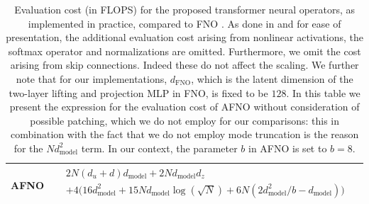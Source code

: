 \documentclass[twoside]{article}
\newcommand{\1}{\mathbbm{1}}
\begin{document}
\begin{table}[htbp]
\begin{tabular}{|l|c|c|}
        \hline
        \textbf{AFNO}& $ \begin{aligned}
            &2N(d_u+d)d_{\textrm{model}} +2Nd_{\textrm{model}}d_z\\
            &+4\bigl(16d_{\textrm{model}}^2 + 15Nd_{\textrm{model}}\log(\sqrt{N}) + 6N(2d_{\textrm{model}}^2/b - d_{\textrm{model}}) \bigr)\\
        \end{aligned}$ \\
        \hline
    \end{tabular}
    \caption{Evaluation cost (in FLOPS) for the proposed transformer neural operators, as implemented in practice, compared to FNO \citep{li2021fourier}. As done in \citet{Kaplan2020ScalingLF} and for ease of presentation, the additional evaluation cost arising from nonlinear activations, the softmax operator and normalizations are omitted. Furthermore, we omit the cost arising from skip connections. Indeed these do not affect the scaling. We further note that for our implementations, $d_{\textrm{FNO}}$, which is the latent dimension of the two-layer lifting and projection MLP in FNO, is fixed to be $128$. In this table we present the expression for the evaluation cost of AFNO without consideration of possible patching, which we do not employ for our comparisons: this in combination with the fact that we do not employ mode truncation is the reason for the $Nd_{\textrm{model}}^2$ term. In our context, the parameter $b$ in AFNO is set to $b=8$.}
    \label{tab:evaluation_cost1}
\end{table}



\end{document}
